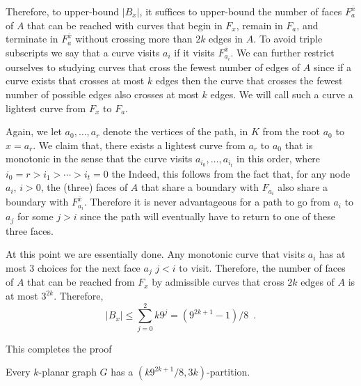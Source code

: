 \documentclass{patmorin}
\begin{document}
Therefore, to upper-bound $|B_x|$, it suffices to upper-bound the number of faces $F^{\bar{x}}_a$ of $A$ that can be reached with curves that begin in $F_x$, remain in $F_a$, and terminate in $F^{\bar{x}}_a$ without crossing more than $2k$ edges in $A$.  To avoid triple subscripts we say that a curve visits $a_i$ if it visits $F^{\bar{x}}_{a_i}$.  We can further restrict ourselves to studying curves that cross the fewest number of edges of $A$ since if a curve exists that crosses at most $k$ edges then the curve that crosses the fewest number of possible edges also crosses at most $k$ edges.  We will call such a curve a lightest curve from $F_x$ to $F_a$.

Again, we let $a_0,\ldots,a_r$ denote the vertices of the path, in $K$ from the root $a_0$ to $x=a_r$.  We claim that, there exists a lightest curve from $a_r$ to $a_0$ that is monotonic in the sense that the curve visits $a_{i_0},\ldots,a_{i_t}$ in this order, where $i_0=r > i_1>\cdots>i_t=0$ the Indeed, this follows from the fact that, for any node $a_i$, $i>0$, the (three) faces of $A$ that share a boundary with $F_{a_i}$ also share a boundary with $F^{\bar{x}}_{a_i}$.  Therefore it is never advantageous for a path to go from $a_i$ to $a_j$ for some $j>i$ since the path will eventually have to return to one of these three faces.

At this point we are essentially done.  Any monotonic curve that visits $a_i$ has at most 3 choices for the next face $a_j$ $j<i$ to visit.  Therefore, the number of faces of $A$ that can be reached from $F_x$ by admissible curves that cross $2k$ edges of $A$ is at most $3^{2k}$. Therefore,
\[
   |B_x| \le \sum_{j=0}^2k 9^j = (9^{2k+1}-1)/8 \enspace .
\]

This completes the proof

\begin{thm}
    Every $k$-planar graph $G$ has a $(k9^{2k+1}/8,3k)$-partition.
\end{thm}








\end{document}
